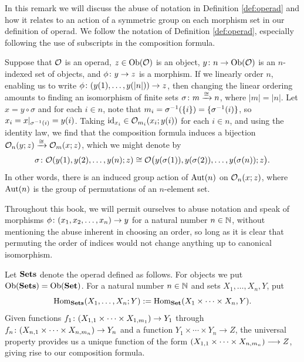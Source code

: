 \begin{remark}\label{rem:symmetry}

In this remark we will discuss the abuse of notation in Definition \ref{def:operad} and how it relates to an action of a symmetric group on each morphism set in our definition of operad. We follow the notation of Definition \ref{def:operad}, especially following the use of subscripts in the composition formula.

Suppose that $\mathcal{O}$ is an operad, $z\in\textnormal{Ob}(\mathcal{O})$ is an object, $y\colon n\rightarrow\textnormal{Ob}(\mathcal{O})$ is an $n$-indexed set of objects, and $\phi\colon y\rightarrow z$ is a morphism. If we linearly order $n$, enabling us to write $\phi\colon (y(1),\ldots,y(|n|))\rightarrow z$, then changing the linear ordering amounts to finding an isomorphism of finite sets $\sigma\colon m\xrightarrow{\cong} n$, where $|m|=|n|$. Let $x=y\circ\sigma$ and for each $i\in n$, note that $m_i=\sigma^\m1(\{i\})=\{\sigma^\m1(i)\}$, so $x_i=x|_{\sigma^\m1(i)}=y(i)$. Taking $\textnormal{id}_{x_i}\in\mathcal{O}_{m_i}(x_i;y(i))$ for each $i\in n$, and using the identity law, we find that the composition formula induces a bijection $\mathcal{O}_n(y;z)\xrightarrow{\cong}\mathcal{O}_m(x;z)$, which we might denote by 
$$\sigma\colon\mathcal{O}(y(1),y(2),\ldots,y(n);z)\cong\mathcal{O}\big(y(\sigma(1)),y(\sigma(2)),\ldots,y(\sigma(n));z\big).$$
In other words, there is an induced group action of $\textnormal{Aut}(n)$ on $\mathcal{O}_n(x;z)$, where $\textnormal{Aut}(n)$ is the group of permutations of an $n$-element set.

Throughout this book, we will permit ourselves to abuse notation and speak of morphisms $\phi\colon (x_1,x_2,\ldots,x_n)\rightarrow y$ for a natural number $n\in{\mathbb N}$, without mentioning the abuse inherent in choosing an order, so long as it is clear that permuting the order of indices would not change anything up to canonical isomorphism.

\end{remark}

\begin{example}

Let ${\bf Sets}$ denote the operad defined as follows. For objects we put $\textnormal{Ob}({\bf Sets})=\textnormal{Ob}({\bf Set})$. For a natural number $n\in{\mathbb N}$ and sets $X_1,\ldots,X_n,Y$, put 
$$\textnormal{Hom}_{\bf Sets}(X_1,\ldots,X_n;Y):=\textnormal{Hom}_{\bf Set}(X_1\times\cdots\times X_n,Y).$$
Given functions $f_1\colon(X_{1,1}\times\cdots\times X_{1,m_1})\rightarrow Y_1$ through $f_n\colon (X_{n,1}\times\cdots\times X_{n,m_n})\rightarrow Y_n$ and a function $Y_1\times\cdots\times Y_n\to Z$, the universal property provides us a unique function of the form $(X_{1,1}\times\cdots\times X_{n,m_n})\longrightarrow Z$, giving rise to our composition formula.

\end{example}

